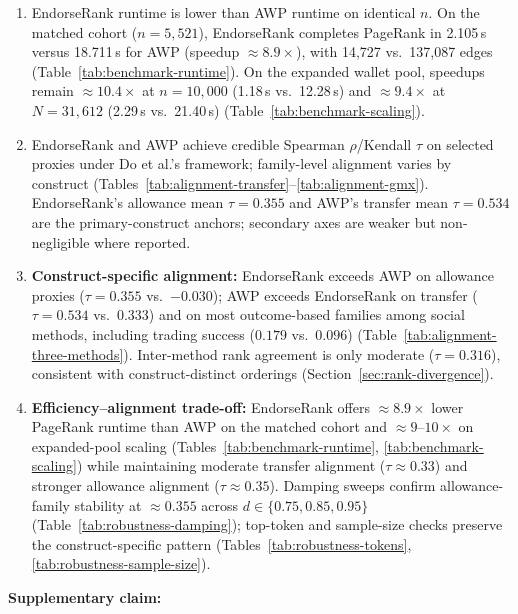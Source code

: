 \begin{enumerate}
\item[\textbf{C1.}] EndorseRank runtime is lower than AWP runtime on identical $n$. On the matched cohort ($n=5{,}521$), EndorseRank completes PageRank in 2.105\,s versus 18.711\,s for AWP (speedup $\approx 8.9\times$), with 14{,}727 vs.\ 137{,}087 edges (Table~\ref{tab:benchmark-runtime}). On the expanded wallet pool, speedups remain $\approx 10.4\times$ at $n=10{,}000$ (1.18\,s vs.\ 12.28\,s) and $\approx 9.4\times$ at $N=31{,}612$ (2.29\,s vs.\ 21.40\,s) (Table~\ref{tab:benchmark-scaling}).

\item[\textbf{C2.}] EndorseRank and AWP achieve credible Spearman $\rho$/Kendall $\tau$ on selected proxies under Do et al.'s framework; family-level alignment varies by construct (Tables~\ref{tab:alignment-transfer}--\ref{tab:alignment-gmx}). EndorseRank's allowance mean $\tau=0.355$ and AWP's transfer mean $\tau=0.534$ are the primary-construct anchors; secondary axes are weaker but non-negligible where reported.

\item[\textbf{C3.}] \textbf{Construct-specific alignment:} EndorseRank exceeds AWP on allowance proxies ($\tau=0.355$ vs.\ $-0.030$); AWP exceeds EndorseRank on transfer ($\tau=0.534$ vs.\ $0.333$) and on most outcome-based families among social methods, including trading success ($0.179$ vs.\ $0.096$) (Table~\ref{tab:alignment-three-methods}). Inter-method rank agreement is only moderate ($\tau=0.316$), consistent with construct-distinct orderings (Section~\ref{sec:rank-divergence}).

\item[\textbf{C4.}] \textbf{Efficiency--alignment trade-off:} EndorseRank offers $\approx 8.9\times$ lower PageRank runtime than AWP on the matched cohort and $\approx 9$--$10\times$ on expanded-pool scaling (Tables~\ref{tab:benchmark-runtime}, \ref{tab:benchmark-scaling}) while maintaining moderate transfer alignment ($\tau \approx 0.33$) and stronger allowance alignment ($\tau \approx 0.35$). Damping sweeps confirm allowance-family stability at $\approx 0.355$ across $d \in \{0.75, 0.85, 0.95\}$ (Table~\ref{tab:robustness-damping}); top-token and sample-size checks preserve the construct-specific pattern (Tables~\ref{tab:robustness-tokens}, \ref{tab:robustness-sample-size}).
\end{enumerate}

\textbf{Supplementary claim:}

